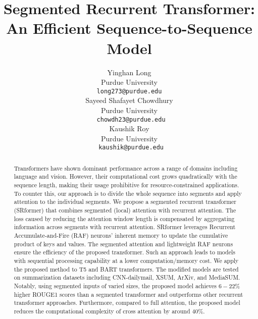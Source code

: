 \documentclass[11pt]{article}
\title{Segmented Recurrent Transformer: An Efficient Sequence-to-Sequence Model}
\author{
Yinghan Long\\
 Purdue University \\
  \texttt{long273@purdue.edu} \\\And
  Sayeed Shafayet Chowdhury \\ 
 Purdue University \\
   \texttt{ chowdh23@purdue.edu}
   \\ \And 
  Kaushik Roy\\
 Purdue University \\
  \texttt{ kaushik@purdue.edu}\\
}
\begin{document}
\maketitle

\begin{abstract}
Transformers have shown dominant performance across a range of domains including language and vision. However, their computational cost grows quadratically with the sequence length, making their usage prohibitive for resource-constrained applications. To counter this, our approach is to divide the whole sequence into segments and apply attention to the individual segments.  We propose a segmented recurrent transformer (SRformer) that combines segmented (local) attention with recurrent attention. The loss caused by reducing the attention window length is compensated by aggregating information across segments with recurrent attention. SRformer leverages Recurrent Accumulate-and-Fire (RAF) neurons' inherent memory to update the cumulative product of keys and values.  The segmented attention and lightweight RAF neurons ensure the efficiency of the proposed transformer. Such an approach leads to models with sequential processing capability at a lower computation/memory cost. We apply the proposed method to T5 and BART transformers. The modified models are tested on summarization datasets including CNN-dailymail, XSUM, ArXiv, and MediaSUM. Notably, using segmented inputs of varied sizes, the proposed model achieves $6-22\%$ higher ROUGE1 scores than a segmented transformer and outperforms other recurrent transformer approaches. Furthermore, compared to full attention, the proposed model reduces the computational complexity of cross attention by around $40\%$.
\end{abstract}
\end{document}
